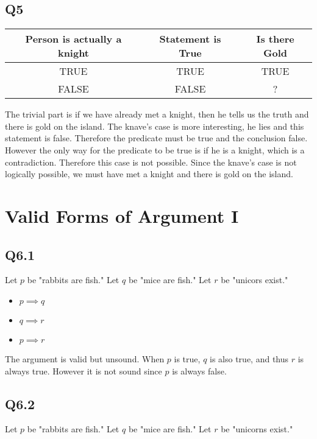 \documentclass[12pt]{article}
\begin{document}
\subsection{Q5}
\begin{tabular}{|c|c|c|}
    \hline 
    Person is actually a knight & Statement is True  & Is there Gold \\
    \hline
    TRUE & TRUE & TRUE \\
    \hline
    FALSE & FALSE & ? \\
    \hline
\end{tabular}
\newline
The trivial part is if we have already met a knight, then he tells us 
the truth and there is gold on the island. 
\newline
The knave's case is more interesting, he lies and this statement is false. Therefore the predicate must be true 
and the conclusion false. However the only way for the predicate to be true is 
if he is a knight, which is a contradiction. Therefore this case is not possible.
\newline
Since the knave's case is not logically possible, we must have met a knight and there is gold on the island.

\section{Valid Forms of Argument I}
\subsection{Q6.1}
Let $p$ be "rabbits are fish."
\newline
Let $q$ be "mice are fish."
\newline
Let $r$ be "unicors exist."

\begin{itemize}
    \item $p \implies q$
    \item $q \implies r$
    \item $p \implies r$
\end{itemize}
The argument is valid but unsound. When $p$ is true, $q$ is also true, 
and thus $r$ is always true. However it is not sound since $p$ is always false.

\subsection{Q6.2}
Let $p$ be "rabbits are fish."
\newline
Let $q$ be "mice are fish."
\newline
Let $r$ be "unicorns exist."
\end{document}
